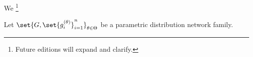 

We \footnote{Future editions will expand and clarify.}


Let $\set{G, \set{g_i^{(\theta)}}_{i=1}^{n}}_{\theta \in \Theta}$ be a parametric distribution network family.

\blankpage
